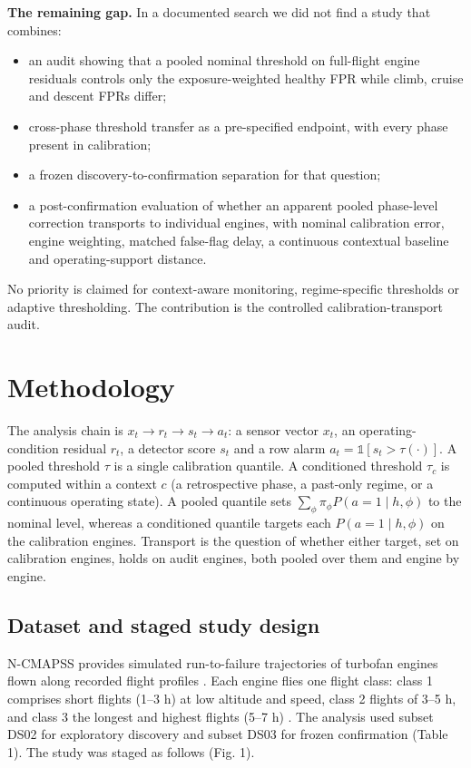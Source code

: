 \documentclass[preprint,11pt,a4paper]{elsarticle}
\begin{document}
\textbf{The remaining gap.} In a documented search we did not find a study that combines:
\begin{itemize}
\item an audit showing that a pooled nominal threshold on full-flight engine residuals controls only the exposure-weighted healthy FPR while climb, cruise and descent FPRs differ;
\item cross-phase threshold transfer as a pre-specified endpoint, with every phase present in calibration;
\item a frozen discovery-to-confirmation separation for that question;
\item a post-confirmation evaluation of whether an apparent pooled phase-level correction transports to individual engines, with nominal calibration error, engine weighting, matched false-flag delay, a continuous contextual baseline and operating-support distance.
\end{itemize}

No priority is claimed for context-aware monitoring, regime-specific thresholds or adaptive thresholding. The contribution is the controlled calibration-transport audit.

\section{Methodology}

The analysis chain is $x_t \rightarrow r_t \rightarrow s_t \rightarrow a_t$: a sensor vector $x_t$, an operating-condition residual $r_t$, a detector score $s_t$ and a row alarm $a_t = \mathbb{1}[s_t > \tau(\cdot)]$. A pooled threshold $\tau$ is a single calibration quantile. A conditioned threshold $\tau_c$ is computed within a context $c$ (a retrospective phase, a past-only regime, or a continuous operating state). A pooled quantile sets $\sum_\phi \pi_\phi P(a=1\mid h,\phi)$ to the nominal level, whereas a conditioned quantile targets each $P(a=1\mid h,\phi)$ on the calibration engines. Transport is the question of whether either target, set on calibration engines, holds on audit engines, both pooled over them and engine by engine.

\subsection{Dataset and staged study design}

N-CMAPSS provides simulated run-to-failure trajectories of turbofan engines flown along recorded flight profiles \cite{ref1}. Each engine flies one flight class: class 1 comprises short flights (1–3 h) at low altitude and speed, class 2 flights of 3–5 h, and class 3 the longest and highest flights (5–7 h) \cite{ref1}. The analysis used subset DS02 for exploratory discovery and subset DS03 for frozen confirmation (Table 1). The study was staged as follows (Fig. 1).
\begin{table}[htbp]
\centering
\small
\caption{Datasets, engine partitions with flight classes, phase roles and calibration arms.}
\label{tab:1}

\end{table}
\end{document}
